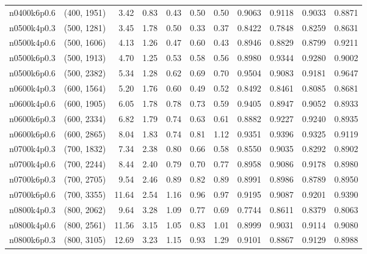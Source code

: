 \begin{tabular}{llrrrrrrrrr}
n0400k6p0.6 &   (400, 1951) &    3.42 &   0.83 &  0.43 &  0.50 &   0.50 &   0.9063 &   0.9118 &     0.9033 &      0.8871 \\
n0500k4p0.3 &   (500, 1281) &    3.45 &   1.78 &  0.50 &  0.33 &   0.37 &   0.8422 &   0.7848 &     0.8259 &      0.8631 \\
n0500k4p0.6 &   (500, 1606) &    4.13 &   1.26 &  0.47 &  0.60 &   0.43 &   0.8946 &   0.8829 &     0.8799 &      0.9211 \\
n0500k6p0.3 &   (500, 1913) &    4.70 &   1.25 &  0.53 &  0.58 &   0.56 &   0.8980 &   0.9344 &     0.9280 &      0.9002 \\
n0500k6p0.6 &   (500, 2382) &    5.34 &   1.28 &  0.62 &  0.69 &   0.70 &   0.9504 &   0.9083 &     0.9181 &      0.9647 \\
n0600k4p0.3 &   (600, 1564) &    5.20 &   1.76 &  0.60 &  0.49 &   0.52 &   0.8492 &   0.8461 &     0.8085 &      0.8681 \\
n0600k4p0.6 &   (600, 1905) &    6.05 &   1.78 &  0.78 &  0.73 &   0.59 &   0.9405 &   0.8947 &     0.9052 &      0.8933 \\
n0600k6p0.3 &   (600, 2334) &    6.82 &   1.79 &  0.74 &  0.63 &   0.61 &   0.8882 &   0.9227 &     0.9240 &      0.8935 \\
n0600k6p0.6 &   (600, 2865) &    8.04 &   1.83 &  0.74 &  0.81 &   1.12 &   0.9351 &   0.9396 &     0.9325 &      0.9119 \\
n0700k4p0.3 &   (700, 1832) &    7.34 &   2.38 &  0.80 &  0.66 &   0.58 &   0.8550 &   0.9035 &     0.8292 &      0.8902 \\
n0700k4p0.6 &   (700, 2244) &    8.44 &   2.40 &  0.79 &  0.70 &   0.77 &   0.8958 &   0.9086 &     0.9178 &      0.8980 \\
n0700k6p0.3 &   (700, 2705) &    9.54 &   2.46 &  0.89 &  0.82 &   0.89 &   0.8991 &   0.8986 &     0.8789 &      0.8950 \\
n0700k6p0.6 &   (700, 3355) &   11.64 &   2.54 &  1.16 &  0.96 &   0.97 &   0.9195 &   0.9087 &     0.9201 &      0.9390 \\
n0800k4p0.3 &   (800, 2062) &    9.64 &   3.28 &  1.09 &  0.77 &   0.69 &   0.7744 &   0.8611 &     0.8379 &      0.8063 \\
n0800k4p0.6 &   (800, 2561) &   11.56 &   3.15 &  1.05 &  0.83 &   1.01 &   0.8999 &   0.9031 &     0.9114 &      0.9080 \\
n0800k6p0.3 &   (800, 3105) &   12.69 &   3.23 &  1.15 &  0.93 &   1.29 &   0.9101 &   0.8867 &     0.9129 &      0.8988 \\

\end{tabular}
